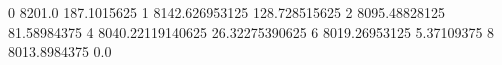 0 8201.0 187.1015625
1 8142.626953125 128.728515625
2 8095.48828125 81.58984375
4 8040.22119140625 26.32275390625
6 8019.26953125 5.37109375
8 8013.8984375 0.0
